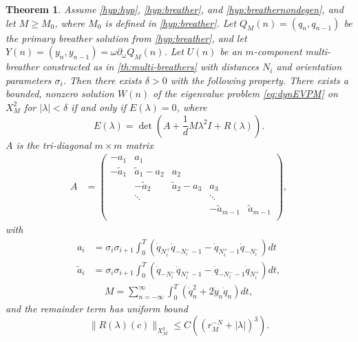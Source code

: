 \documentclass[12pt,reqno]{amsart}
\newtheorem{theorem}{Theorem}
\theoremstyle{definition}
\begin{document}
\begin{theorem}\label{th:spectrum}
Assume \cref{hyp:hyp}, \cref{hyp:breather}, and \cref{hyp:breathernondegen}, and let $M \geq M_0$, where $M_0$ is defined in \cref{hyp:breather}. Let $Q_M(n) = (q_n, q_{n-1})$ be the primary breather solution from \cref{hyp:breather}, and let $Y(n) = (y_n, y_{n-1}) = \omega \partial_\omega Q_M(n)$.
Let $U(n)$ be an $m$-component multi-breather constructed as in \cref{th:multi-breathers} with distances $N_i$ and orientation parameters $\sigma_i$. Then there exists $\delta > 0$ with the following property. There exists a bounded, nonzero solution $W(n)$ of the eigenvalue problem \cref{eq:dynEVPM} on $X_M^2$ for $|\lambda| < \delta$ if and only if $E(\lambda) = 0$, where
\begin{equation}\label{Elambda}
E(\lambda) = \det\left(A + \frac{1}{d}M \lambda^2 I + R(\lambda)\right).
\end{equation}
$A$ is the tri-diagonal $m \times m$ matrix
\begin{align}\label{eq:matrixA}
A &= \begin{pmatrix}
-a_1 & a_1 & & & \\
-\tilde{a}_1 & \tilde{a}_1 - a_2 & a_2 \\
& -\tilde{a}_2 & \tilde{a}_2 - a_3 & a_3 \\
& \ddots & & \ddots \\
& & & -\tilde{a}_{m-1} & \tilde{a}_{m-1}  \\
\end{pmatrix},
\end{align}
with
\begin{equation}\label{eq:ai}
\begin{aligned}
a_i &= \sigma_i \sigma_{i+1} \int_0^T \left( \dot{q}_{N_i^+}\dot{q}_{-N_i^- - 1} 
- \dot{q}_{N_i^+ - 1}\dot{q}_{-N_i^-} \right) dt \\
\tilde{a}_i &= \sigma_i \sigma_{i+1} \int_0^T \left( \dot{q}_{-N_i^-} \dot{q}_{N_i^+ - 1} 
- \dot{q}_{-N_i^- - 1}\dot{q}_{N_i^+} \right) dt,
\end{aligned}
\end{equation}
\begin{align}\label{eq:M}
M =
\sum_{n = -\infty}^\infty \int_0^T \left( \dot{q}_n^2 + 2 \dot{y}_n \dot{q}_n \right) dt,
\end{align}
and the remainder term has uniform bound
\begin{equation}\label{eq:Rbound}
\|R(\lambda)(c)\|_{X_M^2} \leq C \left( (r_M^{-N} + |\lambda|)^3\right).
\end{equation}
\end{theorem}
\end{document}
